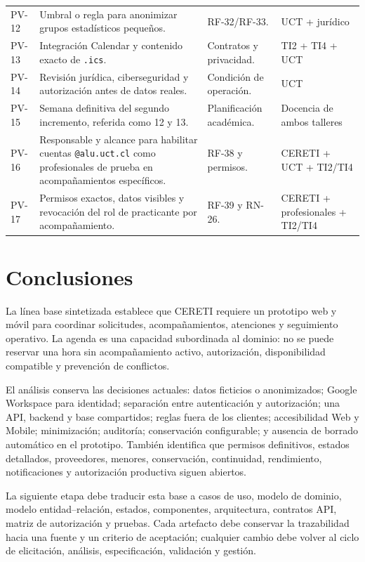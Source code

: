 \documentclass[10pt,a4paper,oneside]{article}
\begin{document}
\begin{longtable}{@{}L{0.07\textwidth}L{0.40\textwidth}L{0.24\textwidth}L{0.20\textwidth}@{}}
PV-12 & Umbral o regla para anonimizar grupos estadísticos pequeños. & RF-32/RF-33. & UCT + jurídico\\
PV-13 & Integración Calendar y contenido exacto de \texttt{.ics}. & Contratos y privacidad. & TI2 + TI4 + UCT\\
PV-14 & Revisión jurídica, ciberseguridad y autorización antes de datos reales. & Condición de operación. & UCT\\
PV-15 & Semana definitiva del segundo incremento, referida como 12 y 13. & Planificación académica. & Docencia de ambos talleres\\
PV-16 & Responsable y alcance para habilitar cuentas \texttt{@alu.uct.cl} como profesionales de prueba en acompañamientos específicos. & RF-38 y permisos. & CERETI + UCT + TI2/TI4\\
PV-17 & Permisos exactos, datos visibles y revocación del rol de practicante por acompañamiento. & RF-39 y RN-26. & CERETI + profesionales + TI2/TI4\\
\end{longtable}
\normalsize
\section{Conclusiones}

La línea base sintetizada establece que CERETI requiere un prototipo web y móvil para coordinar solicitudes, acompañamientos, atenciones y seguimiento operativo. La agenda es una capacidad subordinada al dominio: no se puede reservar una hora sin acompañamiento activo, autorización, disponibilidad compatible y prevención de conflictos.

El análisis conserva las decisiones actuales: datos ficticios o anonimizados; Google Workspace para identidad; separación entre autenticación y autorización; una API, backend y base compartidos; reglas fuera de los clientes; accesibilidad Web y Mobile; minimización; auditoría; conservación configurable; y ausencia de borrado automático en el prototipo. También identifica que permisos definitivos, estados detallados, proveedores, menores, conservación, continuidad, rendimiento, notificaciones y autorización productiva siguen abiertos.

La siguiente etapa debe traducir esta base a casos de uso, modelo de dominio, modelo entidad--relación, estados, componentes, arquitectura, contratos API, matriz de autorización y pruebas. Cada artefacto debe conservar la trazabilidad hacia una fuente y un criterio de aceptación; cualquier cambio debe volver al ciclo de elicitación, análisis, especificación, validación y gestión.
\end{document}
